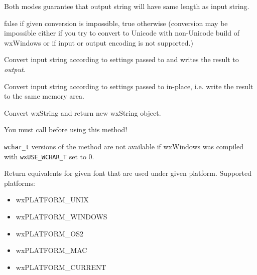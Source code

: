 Both modes guarantee that output string will have same length
as input string.


false if given conversion is impossible, true otherwise
(conversion may be impossible either if you try to convert
to Unicode with non-Unicode build of wxWindows or if input
or output encoding is not supported.)

\label{wxencodingconverterconvert}





Convert input string according to settings passed to
 and writes the result to {\it output}.



Convert input string according to settings passed to
 in-place, i.e. write the result to the
same memory area.


Convert wxString and return new wxString object.


You must call  before using this method!

{\tt wchar\_t} versions of the method are not available if wxWindows was compiled
with {\tt wxUSE\_WCHAR\_T} set to 0.

\label{wxencodingconvertergetplatformequivalents}


Return equivalents for given font that are used
under given platform. Supported platforms:

\begin{itemize}\itemsep=0pt
\item wxPLATFORM\_UNIX
\item wxPLATFORM\_WINDOWS
\item wxPLATFORM\_OS2
\item wxPLATFORM\_MAC
\item wxPLATFORM\_CURRENT
\end{itemize}

